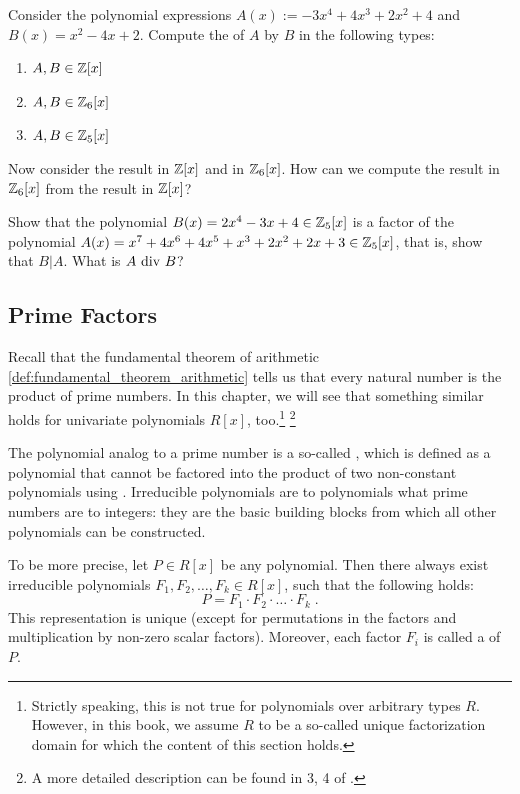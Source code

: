 \begin{exercise} Consider the polynomial expressions $A(x):= -3x^4 + 4x^3 + 2x^2 +4$ and $B(x)= x^2-4x+2$. Compute the  of $A$ by $B$ in the following types:
\begin{enumerate}
\item $A,B\in \mathbb{Z}[x]$
\item $A,B\in \mathbb{Z}_6[x]$
\item $A,B\in \mathbb{Z}_5[x]$
\end{enumerate}
Now consider the result in $\mathbb{Z}[x]$ and in $\mathbb{Z}_6[x]$. How can we compute the result in $\mathbb{Z}_6[x]$ from the result in $\mathbb{Z}[x]$?
\end{exercise}
\begin{exercise}
Show that the polynomial $B(x)= 2x^4-3x+4\in \mathbb{Z}_5[x]$ is a factor of the polynomial $A(x)=x^7 + 4x^6 + 4x^5 + x^3 + 2x^2 + 2x + 3\in\mathbb{Z}_5[x]$, that is, show that $B|A$. What is $A \text{ div } B$?
\end{exercise}
\subsection{Prime Factors} Recall that the fundamental theorem of arithmetic \ref{def:fundamental_theorem_arithmetic} tells us that every natural number is the product of prime numbers. In this chapter, we will see that something similar holds for univariate polynomials $R[x]$, too.\footnote{Strictly speaking, this is not true for polynomials over arbitrary types $R$. However, in this book, we assume $R$ to be a so-called unique factorization domain for which the content of this section holds.}
\footnote{A more detailed description can be found in \chaptname{} 3, \secname{} 4 of \cite{mignotte-1992}.}


The polynomial analog to a prime number is a so-called , which is defined as a polynomial that cannot be factored into the product of two non-constant polynomials using . Irreducible polynomials are to polynomials what prime numbers are to integers: they are the basic building blocks from which all other polynomials can be constructed. 

To be more precise, let $P \in R[x]$ be any polynomial. Then there always exist irreducible polynomials $F_1, F_2, \ldots, F_k \in R[x]$, such that the following holds:
\begin{equation}
\label{def_polynomial_prime_factorization}
P = F_1 \cdot F_2 \cdot \ldots \cdot F_k \;.
\end{equation}
This representation is unique (except for permutations in the factors and multiplication by non-zero scalar factors). Moreover, each factor $F_i$ is called a  of $P$.

